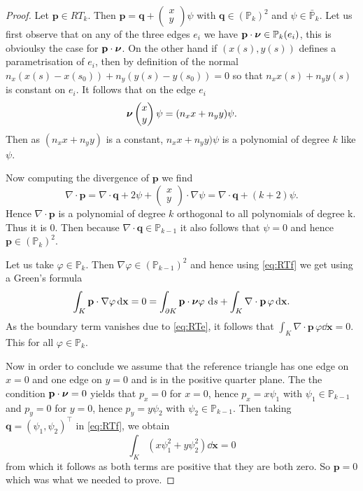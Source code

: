 \begin{proof}
Let $ \mathbf{p} \in RT_k$. Then $ \mathbf{p} = \mathbf{q} + \begin{pmatrix} x\\ y \end{pmatrix} \psi$
with $\mathbf{q}\in (\mathbb{P}_k)^2$ and $\psi\in \bar{ \mathbb{P}}_k$.
Let us first observe that on any of the three edges $e_i$ we have
  $ \mathbf{p}\cdot \boldsymbol{\nu}\in \mathbb{P}_k(e_i)$, this is obvioulsy the case for
$ \mathbf{p}\cdot \boldsymbol{\nu}$. On the other hand if $(x(s),y(s))$ defines a parametrisation of $e_i$, then
by definition of the normal $n_x (x(s)-x(s_0)) + n_y (y(s)-y(s_0)) = 0$ so that
$n_x x(s) + n_y y(s)$ is constant on $e_i$. It follows that on the edge $e_i$
$$ \boldsymbol{\nu}\begin{pmatrix} x\\ y \end{pmatrix} \psi= (n_x x + n_yy)\psi.$$
Then as $(n_x x + n_yy)$ is a constant, $n_x x + n_yy)\psi$ is a polynomial of degree $k$ like $\psi$.

Now  computing the divergence of  $\mathbf{p}$ we find
$$\nabla\cdot \mathbf{p} = \nabla\cdot \mathbf{q} + 2\psi + \begin{pmatrix} x\\ y \end{pmatrix} \cdot \nabla\psi
= \nabla\cdot \mathbf{q}  + (k+2)\psi. $$
Hence $ \nabla\cdot \mathbf{p}$ is a polynomial of degree $k$ orthogonal to all polynomials of degree k. Thus it is 0. Then because $\nabla\cdot \mathbf{q} \in \mathbb{P}_{k-1}$ it also follows that $\psi=0$ and hence
$\mathbf{p}\in (\mathbb{P}_k)^2$.


Let us take $\varphi\in \mathbb{P}_k$. Then $\nabla\varphi\in (\mathbb{P}_{k-1})^2$ and hence using
\eqref{eq:RTf} we get using a Green's formula
$$\int_K \mathbf{p}  \cdot \nabla\varphi \,{\rm d} \mathbf{x} =0 = \int_{\partial K}  \mathbf{p}\cdot \boldsymbol{\nu}\varphi \, \,{\rm d} s + \int_K \nabla\cdot \mathbf{p} \, \varphi \,{\rm d} \mathbf{x}.$$
As the boundary term vanishes due to \eqref{eq:RTe}, it follows that $\int_K \nabla\cdot \mathbf{p} \, \varphi \dd \mathbf{x}=0$. This for all $\varphi\in \mathbb{P}_k$.


Now in order to conclude we assume that the reference triangle has one edge on $x=0$ and one edge on $y=0$ and is in the positive quarter plane.
The the condition $ \mathbf{p}\cdot \boldsymbol{\nu}=0$ yields that $p_x=0$ for $x=0$, hence $p_x= x\psi_1$ with
$\psi_1\in \mathbb{P}_{k-1}$ and $p_y=0$ for $y=0$, hence $p_y= y\psi_2$ with
$\psi_2\in \mathbb{P}_{k-1}$. Then taking $\mathbf{q}=(\psi_1,\psi_2)^\top$ in \eqref{eq:RTf}, we obtain
$$\int_K (x\psi_1^2 +y\psi_2^2) \dd \mathbf{x}=0$$
from which it follows as both terms are positive that they are both zero. So $ \mathbf{p}=0$ which was what we needed to prove.
\end{proof}

